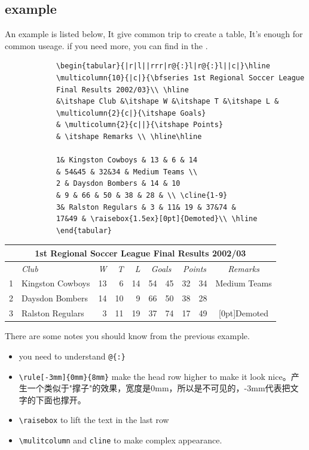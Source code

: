 \documentclass[a4paper,12pt,twoside]{book}
\begin{document}
\begin{CJK*}{UTF8}{song}
		\subsection{example}
			An example is listed below, It give common trip to create a table, It's enough for common useage. if you need more, you can find in the \cite{Companion}.
			\begin{verbatim}
			\begin{tabular}{|r|l||rrr|r@{:}l|r@{:}l||c|}\hline
			\multicolumn{10}{|c|}{\bfseries 1st Regional Soccer League
			Final Results 2002/03}\\ \hline
			&\itshape Club &\itshape W &\itshape T &\itshape L &
			\multicolumn{2}{c|}{\itshape Goals}
			& \multicolumn{2}{c||}{\itshape Points}
			& \itshape Remarks \\ \hline\hline
			
			1& Kingston Cowboys & 13 & 6 & 14
			& 54&45 & 32&34 & Medium Teams \\
			2 & Daysdon Bombers & 14 & 10
			& 9 & 66 & 50 & 38 & 28 & \\ \cline{1-9}
			3& Ralston Regulars & 3 & 11& 19 & 37&74 &
			17&49 & \raisebox{1.5ex}[0pt]{Demoted}\\ \hline
			\end{tabular}
			\end{verbatim}
			
			\begin{tabular}{|r|l||rrr|r@{:}l|r@{:}l||c|}\hline
			\multicolumn{10}{|c|}{ \rule[-3mm]{0mm}{8mm} \bfseries 1st Regional Soccer League
			Final Results 2002/03}\\ \hline
			&\itshape Club &\itshape W &\itshape T &\itshape L &
			\multicolumn{2}{c|}{\itshape Goals}
			& \multicolumn{2}{c||}{\itshape Points}
			& \itshape Remarks \\ \hline\hline
			
			1& Kingston Cowboys & 13 & 6 & 14 & 54&45 & 32&34 & Medium Teams \\ \hline
			2 & Daysdon Bombers & 14 & 10 & 9 & 66 & 50 & 38 & 28 & \\ \cline{1-9}
			3& Ralston Regulars & 3 & 11 & 19 & 37&74 & 17&49 & \raisebox{1.5ex}[0pt]{Demoted}\\ \hline
			\end{tabular}
			There are some notes you should know from the previous example.
			\begin{itemize}
			\item you need to understand \verb=@{:}=
			\item \verb=\rule[-3mm]{0mm}{8mm}= make the
head row higher to make it look
nice。产生一个类似于"撑子"的效果，宽度是0mm，所以是不可见的，-3mm代表把文字的下面也撑开。
			\item \verb=\raisebox= to lift the text in the last row
			\item \verb=\mulitcolumn= and \verb=cline= to make complex appearance.
			\end{itemize}


\end{CJK*}
\end{document}

